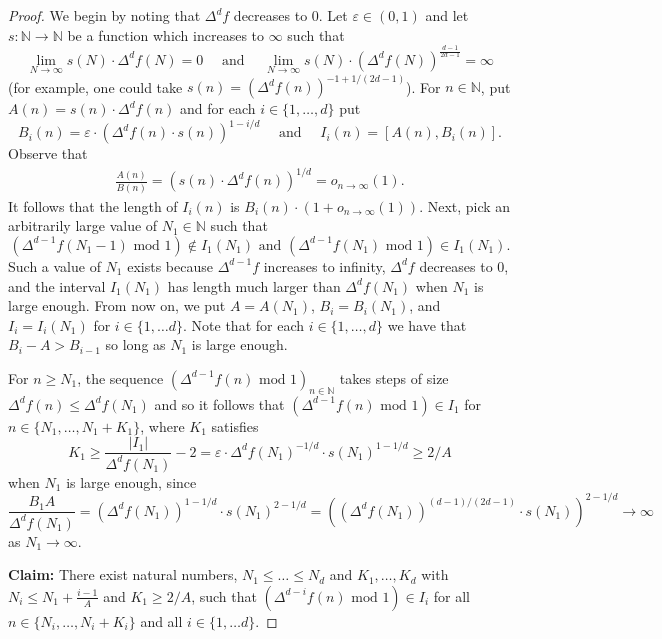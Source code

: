 \documentclass[10pt,a4paper]{amsart}
\newcommand{\N}{\mathbb{N}}
\renewcommand{\epsilon}{\varepsilon}
\renewcommand{\geq}{\geqslant}
\renewcommand{\leq}{\leqslant}
\newcommand{\oo}{\infty}
\begin{document}
\begin{proof}

We begin by noting that $\Delta^df$ decreases to $0$. Let $\epsilon\in (0,1)$ and let $s:\N\rightarrow \N$ be a function which increases to $\oo$ such that
\begin{equation}\label{eq:s_growth}
\lim_{N\to\oo}s(N)\cdot \Delta^df(N)=0\quad \text{ and }\quad \lim_{N\to\oo}s(N)\cdot (\Delta^df(N))^{\frac{d-1}{2d-1}}=\oo
\end{equation}
(for example, one could take $s(n) = (\Delta^d f(n))^{-1+1/(2d-1)}$).
For $n\in \N$, put $A(n) =s(n)\cdot \Delta^df(n)$ and for each $i\in \{1,\dots, d\}$ put 
\begin{equation}
   B_{i}(n) = \epsilon\cdot \left({\Delta^{d}f(n)}\cdot s(n)\right)^{1-i/d}\quad \text{ and }\quad I_i(n) = \left[A(n),B_i(n)\right].
\end{equation}
Observe that 
\begin{align*}
    \frac{A(n)}{B(n)} = (s(n)\cdot \Delta^df(n))^{1/d}=o_{n\to\oo}(1).
\end{align*}
It follows that the length of $I_i(n)$ is $B_i(n)\cdot (1+o_{n\to\oo}(1)) $. Next, pick an arbitrarily large value of $N_1\in \N$ such that
\[
(\Delta^{d-1}f(N_1-1) \text{ mod } 1) \not\in I_{1}(N_1)\text{ and }(\Delta^{d-1}f(N_1) \text{ mod } 1) \in I_{1}(N_1).
\]
Such a value of $N_1$ exists because $\Delta^{d-1}f$ increases to infinity, $\Delta^{d}f$ decreases to $0$, and the interval $I_{1}(N_1)$ has length much larger than $\Delta^{d}f(N_1)$ when $N_1$ is large enough. From now on, we put $A = A(N_1)$, $B_i = B_i(N_1)$, and $I_i = I_i(N_1)$ for $i\in \{1,\dots d\}$. Note that for each $i\in \{1,\dots, d\}$ we have that $B_i-A>B_{i-1}$ so long as $N_1$ is large enough.  


For $n\geq N_1$, the sequence $(\Delta^{d-1}f(n) \text{ mod } 1)_{n\in \N}$ takes steps of size $\Delta^{d}f(n)\leq \Delta^{d}f(N_1)$ and so it follows that $(\Delta^{d-1}f(n) \text{ mod } 1) \in I_{1}$ for $n\in \{N_1,\dots, N_1+K_1\}$, where $K_1$ satisfies
\begin{equation}\label{eq:K_1_big}
K_1\geq \frac{ |I_{1}|}{\Delta^{d}f(N_1)}-2 = \epsilon\cdot {\Delta^{d}f(N_1)^{-1/d}}\cdot s(N_1)^{1-1/d} \geq 2/ A
\end{equation}
when $N_1$ is large enough, since 
\[
\frac{B_1 A}{\Delta^{d}f(N_1)}= (\Delta^{d}f(N_1))^{1-1/d}\cdot s(N_1)^{2-1/d} = ((\Delta^{d}f(N_1))^{(d-1)/(2d-1)}\cdot s(N_1))^{2-1/d}\to \oo
\]
as $N_1\to\oo$.


\textbf{Claim:} There exist natural numbers, $N_1\leq \dots \leq N_{d}$ and $K_1,\dots, K_{d}$ with $N_{i}\leq N_1+\frac{i-1}{A}$ and $K_1\geq 2/A$, such that $(\Delta^{d-i}f(n)\text{ mod } 1)\in  I_{i}$ for all $n\in \{N_i,\dots, N_i+K_i\}$ and all $i\in\{1,\dots d\}$.



\end{proof}
\end{document}
